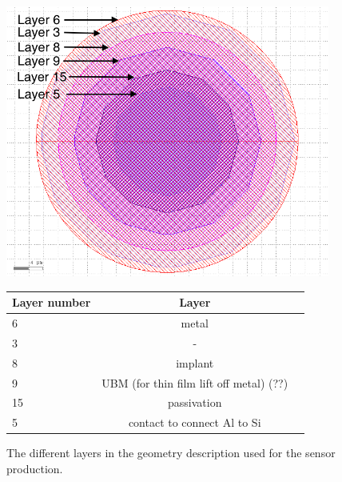 \begin{figure}[htbp]
  \centering
  \begin{minipage}[t]{.4\textwidth}
    \centering
    \vspace{0pt}
    \includegraphics[width=0.95\textwidth]{figures/ActiveEdge/pixelLayout_withLayers.png}
    \caption{The different layers in the geometry description used for
      the sensor production.}
    \label{fig:PixelLayout}
  \end{minipage}
  \hfill
  \begin{minipage}[t]{.56\textwidth}
    \centering
    \vspace{0pt}
    \label{tab:PixelStackDimensions}
    \begin{tabular}{l c c}
      \toprule
      Layer number & Layer \\
      \midrule
      6 & metal\\
      3 & - \\
      8 & implant \\
      9 & UBM (for thin film lift off metal) (??) \\
      15 & passivation \\
      5 & contact to connect Al to Si \\
      \bottomrule
    \end{tabular}
  \end{minipage}
\end{figure}


